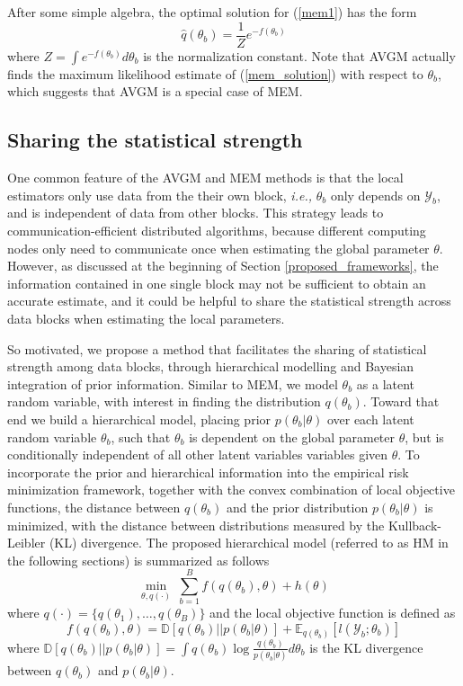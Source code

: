 \documentclass{article}
\newcommand{\ie}[0]{\emph{i.e., }}
\newcommand{\1}[0]{\ensuremath{\boldsymbol{1}}\xspace}
\begin{document}
After some simple algebra, the optimal solution for (\ref{mem1}) has the form
\begin{equation}\label{mem_solution}
\textstyle \hat q(\theta_b) = \frac{1}{Z}e^{-f(\theta_b)}
\end{equation}
where $Z = \int e^{-f(\theta_b)} d\theta_b$ is the normalization constant. Note that AVGM actually finds the maximum likelihood estimate of (\ref{mem_solution}) with respect to $\theta_b$, which suggests that AVGM is a special case of MEM.


\subsection{Sharing the statistical strength}\label{HM}

One common feature of the AVGM and MEM methods is that the local estimators only use data from the their own block, \ie $\theta_b$ only depends on $\mathcal{Y}_b$, and is independent of data from other blocks. This strategy leads to communication-efficient distributed algorithms, because different computing nodes only need to communicate once when estimating the global parameter $\theta$. However, as discussed at the beginning of Section \ref{proposed_frameworks}, the information contained in one single block may not be sufficient to obtain an accurate estimate, and it could be helpful to share the statistical strength across data blocks when estimating the local parameters.

So motivated, we propose a method that facilitates the sharing of statistical strength among data blocks, through hierarchical modelling and Bayesian integration of prior information. Similar to MEM, we model $\theta_b$ as a latent random variable, with interest in finding the distribution $q(\theta_b)$. Toward that end we build a hierarchical model, placing prior $p(\theta_b | \theta)$ over each latent random variable $\theta_b$, such that $\theta_b$ is dependent on the global parameter $\theta$, but is conditionally independent of all other latent variables variables given $\theta$. To incorporate the prior and hierarchical information into the empirical risk minimization framework, together with the convex combination of local objective functions, the distance between $q(\theta_b)$ and the prior distribution $p(\theta_b|\theta)$ is minimized, with the distance between distributions measured by the Kullback-Leibler (KL) divergence. The proposed hierarchical model (referred to as HM in the following sections) is summarized as follows
\begin{equation}\label{hm}
\textstyle \min_{\theta, q(\cdot)} ~ \sum_{b=1}^B f(q(\theta_b), \theta) + h(\theta)
\end{equation}
where $q(\cdot) = \{q(\theta_1), \ldots, q(\theta_B)\}$ and the local objective function is defined as
\begin{equation}\label{local_obj}
\textstyle f(q(\theta_b), \theta)  = \mathbb{D}[q(\theta_b)||p(\theta_b|\theta)] + \mathbb{E}_{q(\theta_b)}[l(\mathcal{Y}_b; \theta_b)]
\end{equation}
where $\mathbb{D}[q(\theta_b)||p(\theta_b|\theta)] = \int q(\theta_b)\log\frac{q(\theta_b)}{p(\theta_b|\theta)}d\theta_b$ is the KL divergence between $q(\theta_b)$ and $p(\theta_b|\theta)$. 
\end{document}
